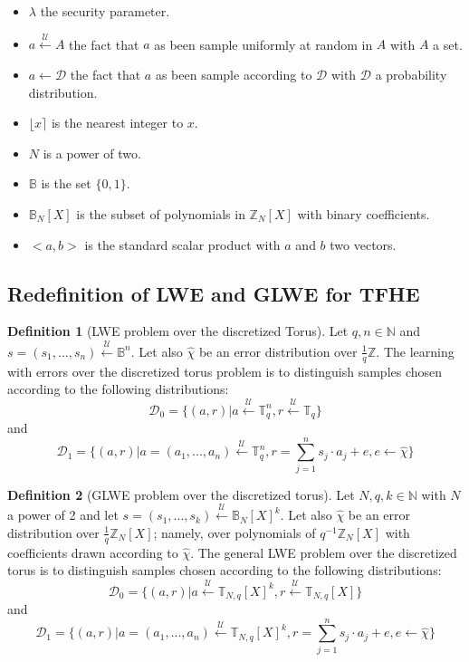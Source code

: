 \documentclass{article}
\newcommand{\Z}{\mathbb{Z}}
\newcommand{\N}{\mathbb{N}}
\newcommand{\T}{\mathbb{T}}
\newcommand{\B}{\mathbb{B}}
\newcommand{\Dcal}{\mathcal{D}}
\newcommand{\Sunif}{\xleftarrow{\mathcal{U}}}
\newcommand{\ChiChap}{\hat{\chi}}
\newcommand{\round}[1]{\lfloor#1\rceil}
\theoremstyle{definition}
\newtheorem{definition}{Definition}[section]
\theoremstyle{Theorem}
\begin{document}
\begin{itemize}
    \item $\lambda$ the security parameter.
    \item $a \Sunif A$ the fact that $a$ as been sample uniformly at  random in $A$ with $A$ a set.
    \item $a \leftarrow \mathcal{D}$ the fact that $a$ as been sample according to $\mathcal{D}$ with $\mathcal{D}$ a probability distribution.
    \item $\round{x}$ is the nearest integer to $x$.
    \item $N$ is a power of two.
    \item $\B$ is the set $\{0,1\}$.
    \item $\B_N[X]$ is the subset of polynomials in $\Z_N[X]$ with binary coefficients.
    \item $<a,b>$ is the standard scalar product with $a$ and $b$ two vectors. 
\end{itemize}

\subsection{Redefinition of LWE and GLWE for TFHE}

\begin{definition}[LWE problem over the discretized Torus]
    Let $q,n\in \N$ and $s=(s_1,...,s_n) \Sunif\B^n$. Let also $\ChiChap$ be an error distribution over $\frac{1}{q}\Z$. The learning with errors over the discretized torus problem is to distinguish samples chosen according to the following distributions:
    $$\Dcal_0=\{(a,r)|a\Sunif\T_q^n,r\Sunif\T_q\}$$
    and
    $$\Dcal_1=\{(a,r)|a=(a_1,...,a_n)\Sunif\T_q^n,r=\sum_{j=1}^ns_j\cdot a_j+e,e\leftarrow\ChiChap\}$$
\end{definition}

\begin{definition}[GLWE problem over the discretized torus]
    Let $N,q,k\in \N$ with $N$ a power of 2 and let $s=(s_1,...,s_k)\Sunif\B_N[X]^k$. Let also $\ChiChap$ be an error distribution over $\frac{1}{q}\Z_N[X]$; namely, over polynomials of $q^{-1}\Z_N[X]$ with coefficients drawn according to $\ChiChap$. The general LWE problem over the discretized torus is to distinguish samples chosen according to the following distributions:
    $$\Dcal_0=\{(a,r)|a\Sunif\T_{N,q}[X]^k,r\Sunif\T_{N,q}[X]\}$$
    and
    $$\Dcal_1=\{(a,r)|a=(a_1,...,a_n)\Sunif\T_{N,q}[X]^k,r=\sum_{j=1}^ns_j\cdot a_j+e,e\leftarrow\ChiChap\}$$
\end{definition}
\end{document}
